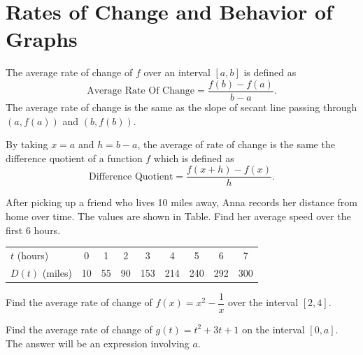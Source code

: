 \newpage

\section{Rates of Change and Behavior of Graphs}

\begin{definition}
  The average rate of change of $f$ over an interval $[a,b]$ is defined as
  $$\text{Average Rate Of Change}=\dfrac{f(b)-f(a)}{b-a}.$$
  The average rate of change is the same as the slope of secant line passing through $(a, f(a))$ and $(b, f(b))$.
  
  By taking $x=a$ and $h=b-a$, the average of rate of change is the same the difference quotient of a function $f$ which is defined as
  $$\text{Difference Quotient}=\dfrac{f(x+h)-f(x)}{h}.$$
\end{definition}

\begin{example}
  After picking up a friend who lives 10 miles away, Anna records her distance from home over time. The values are shown in Table. Find her average speed over the first 6 hours.
\begin{center}
  \begin{tabular}{l*{8}{c}}
    $t$ (hours) & 0 & 1 & 2 & 3 & 4 & 5 & 6 & 7\\
    $D(t)$ (miles) & 10 & 55 & 90 & 153 & 214 & 240 & 292 & 300
  \end{tabular}
\end{center}
\end{example}

\begin{example}
  Find the average rate of change of $f(x)=x^2-\dfrac{1}{x}$ over the interval $[2, 4]$.
\end{example}

\newpage

\begin{example}
  Find the average rate of change of  $g(t)=t^2+3t+1$ on the interval  $[0,a]$. The answer will be an expression involving $a$.
\end{example}



